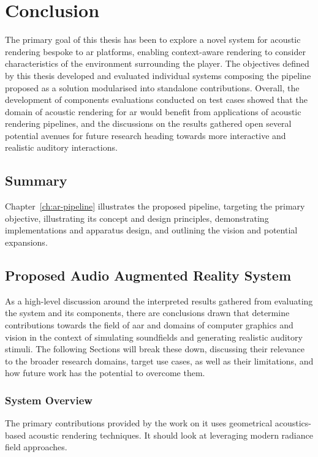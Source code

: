 \chapter{Conclusion}\label{ch:Conclusion}

The primary goal of this thesis has been to explore a novel system for acoustic rendering bespoke to \acrshort{ar} platforms, enabling context-aware rendering to consider characteristics of the environment surrounding the player. The objectives defined by this thesis developed and evaluated individual systems composing the pipeline proposed as a solution modularised into standalone contributions. Overall, the development of components evaluations conducted on test cases showed that the domain of acoustic rendering for \acrshort{ar} would benefit from applications of acoustic rendering pipelines, and the discussions on the results gathered open several potential avenues for future research heading towards more interactive and realistic auditory interactions.

\section{Summary}
Chapter~\ref{ch:ar-pipeline} illustrates the proposed pipeline, targeting the primary objective, illustrating its concept and design principles, demonstrating implementations and apparatus design, and outlining the vision and potential expansions. 

\section{Proposed Audio Augmented Reality System}
As a high-level discussion around the interpreted results gathered from evaluating the system and its components, there are conclusions drawn that determine contributions towards the field of \acrfull{aar} and domains of computer graphics and vision in the context of simulating soundfields and generating realistic auditory stimuli. The following Sections will break these down, discussing their relevance to the broader research domains, target use cases, as well as their limitations, and how future work has the potential to overcome them.

\subsection{System Overview}
The primary contributions provided by the work on 
it uses geometrical acoustics-based acoustic rendering techniques. It should look at leveraging modern radiance field approaches.

